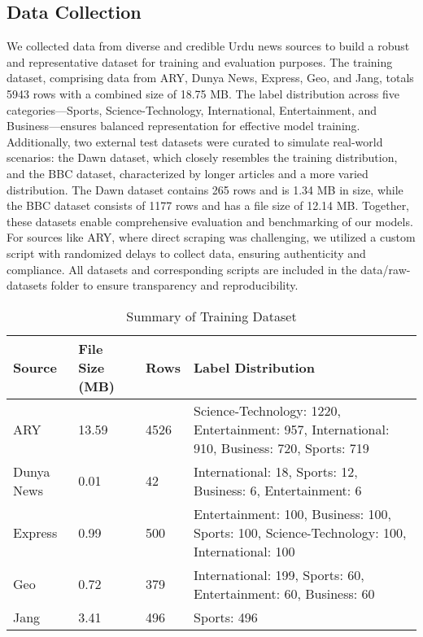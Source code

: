 \documentclass[sigconf]{acmart}
\begin{document}
\subsection{Data Collection}
We collected data from diverse and credible Urdu news sources to build a robust and representative dataset for training and evaluation purposes. The training dataset, comprising data from ARY, Dunya News, Express, Geo, and Jang, totals 5943 rows with a combined size of 18.75 MB. The label distribution across five categories—Sports, Science-Technology, International, Entertainment, and Business—ensures balanced representation for effective model training. Additionally, two external test datasets were curated to simulate real-world scenarios: the Dawn dataset, which closely resembles the training distribution, and the BBC dataset, characterized by longer articles and a more varied distribution. The Dawn dataset contains 265 rows and is 1.34 MB in size, while the BBC dataset consists of 1177 rows and has a file size of 12.14 MB. Together, these datasets enable comprehensive evaluation and benchmarking of our models. For sources like ARY, where direct scraping was challenging, we utilized a custom script with randomized delays to collect data, ensuring authenticity and compliance. All datasets and corresponding scripts are included in the data/raw-datasets folder to ensure transparency and reproducibility.

\begin{table}[h]
    \caption{Summary of Training Dataset}
    \label{tab:training_summary}
    \begin{tabular}{|l|l|l|p{3cm}|}
        \hline
        \textbf{Source} & \textbf{File Size (MB)} & \textbf{Rows} & \textbf{Label Distribution} \\
        \hline
        ARY & 13.59 & 4526 & Science-Technology: 1220, Entertainment: 957, International: 910, Business: 720, Sports: 719 \\
        \hline
        Dunya News & 0.01 & 42 & International: 18, Sports: 12, Business: 6, Entertainment: 6 \\
        \hline
        Express & 0.99 & 500 & Entertainment: 100, Business: 100, Sports: 100, Science-Technology: 100, International: 100 \\
        \hline
        Geo & 0.72 & 379 & International: 199, Sports: 60, Entertainment: 60, Business: 60 \\
        \hline
        Jang & 3.41 & 496 & Sports: 496 \\
        \hline
    \end{tabular}
\end{table}
\end{document}
